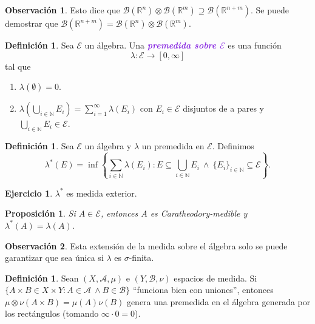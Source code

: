 \documentclass{article}
\newtheorem{proposition}[theorem]{Proposición}
\theoremstyle{definition}
\newtheorem{definition}[theorem]{Definición}
\newtheorem{exercise}{Ejercicio}
\newtheorem*{obs}{Observación}
\theoremstyle{remark}
\numberwithin{equation}{section}
\newcommand{\N}{\mathbb{N}}
\newcommand{\R}{\mathbb{R}}
\newcommand{\Acal}{\mathcal{A}}
\newcommand{\Bcal}{\mathcal{B}}
\newcommand{\Ecal}{\mathcal{E}}
\newcommand{\lam}{\lambda}
\newcommand{\oo}{\infty}
\newcommand{\br}[1]{\left( #1 \right)}
\newcommand{\set}[1]{\left\{ #1 \right\}}
\newcommand{\wea}[1]{\textcolor{BlueViolet}{\textbf{\emph{#1}}}}
\begin{document}
\begin{obs}
  Esto dice que $\Bcal(\R^n) \otimes \Bcal(\R^m) \supseteq \Bcal(\R^{n+m})$. Se puede demostrar que $\Bcal(\R^{n+m}) = \Bcal(\R^n) \otimes \Bcal(\R^m)$. %
\end{obs}

\begin{definition}
  Sea $\Ecal$ un álgebra. Una \wea{premedida sobre $\Ecal$} es una función
  \[ \lam \colon \Ecal \to [0,\oo] \]
  tal que
  \begin{enumerate}[(1)]
    \item $\lam(\emptyset) = 0$.
    \item $\lam\br{\bigcup_{i\in\N} E_i} = \sum_{i=1}^\oo \lam(E_i)$ con $E_i \in \Ecal$ disjuntos de a pares y $\bigcup_{i\in\N} E_i \in \Ecal$.
  \end{enumerate}
\end{definition}

\begin{definition}
  Sea $\Ecal$ un álgebra y $\lam$ un premedida en $\Ecal$. Definimos
  \[ \lam^*(E) = \inf\set{\sum_{i\in\N} \lam(E_i) : E \subseteq \bigcup_{i\in\N} E_i \ \land \ \{E_i\}_{i\in\N} \subseteq \Ecal}. \]
\end{definition}

\begin{exercise}
  $\lam^*$ es medida exterior.
\end{exercise}

\begin{proposition}
  Si $A \in \Ecal$, entonces $A$ es Caratheodory-medible y $\lam^*(A) = \lam(A)$.
\end{proposition}

\begin{obs}
  Esta extensión de la medida sobre el álgebra solo se puede garantizar que sea única si $\lam$ es $\sigma$-finita.
\end{obs}

\begin{definition}
  Sean $(X,\Acal,\mu)$ e $(Y,\Bcal,\nu)$ espacios de medida. Si $\{A \times B \in X \times Y : A \in \Acal \ \land B \in \Bcal\}$ ``funciona bien con uniones'', %
  entonces $\mu \otimes \nu(A \times B) = \mu(A) \nu(B)$ genera una premedida en el álgebra generada por los rectángulos (tomando $\oo \cdot 0 = 0$).
\end{definition}
\end{document}
